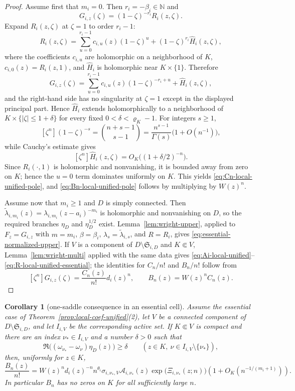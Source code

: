 \documentclass[reqno]{article}
\newtheorem{cor}[theorem]{Corollary}
\theoremstyle{definition}
\theoremstyle{remark}
\theoremstyle{plain}
\begin{document}
\begin{proof}
Assume first that $m_i=0$. Then $r_i=-\beta_i\in\mathbb N$ and
$$G_{i,z}(\zeta)=(1-\zeta)^{-r_i}R_i(z,\zeta).$$
Expand $R_i(z,\zeta)$ at $\zeta=1$ to order $r_i-1$:
$$R_i(z,\zeta)=\sum_{u=0}^{r_i-1}c_{i,u}(z)(1-\zeta)^u+(1-\zeta)^{r_i}\widehat H_i(z,\zeta),$$
where the coefficients $c_{i,u}$ are holomorphic on a neighborhood of $K$, $c_{i,0}(z)=R_i(z,1)$, and $\widehat H_i$ is holomorphic near $K\times\{1\}$. Therefore
$$G_{i,z}(\zeta)=\sum_{u=0}^{r_i-1}c_{i,u}(z)(1-\zeta)^{-r_i+u}+\widehat H_i(z,\zeta),$$
and the right-hand side has no singularity at $\zeta=1$ except in the displayed principal part. Hence $\widehat H_i$ extends holomorphically to a neighborhood of $K\times\{|\zeta|\le1+\delta\}$ for every fixed $0<\delta<\varrho_K-1$. For integers $s\ge1$,
$$[\zeta^n](1-\zeta)^{-s}=\binom{n+s-1}{s-1}
=\frac{n^{s-1}}{\Gamma(s)}\bigl(1+O(n^{-1})\bigr),$$
while Cauchy's estimate gives
$$[\zeta^n]\widehat H_i(z,\zeta)=O_K\!\bigl((1+\delta/2)^{-n}\bigr).$$
Since $R_i(\cdot,1)$ is holomorphic and nonvanishing, it is bounded away from zero on $K$; hence the $u=0$ term dominates uniformly on $K$. This yields \eqref{eq:Cn-local-unified-pole}, and \eqref{eq:Bn-local-unified-pole} follows by multiplying by $W(z)^n$.

Assume now that $m_i\ge1$ and $D$ is simply connected. Then $\widetilde\lambda_{i,m_i}(z)=\lambda_{i,m_i}(z-a_i)^{-m_i}$ is holomorphic and nonvanishing on $D$, so the required branches $\eta_D$ and $\eta_D^{1/2}$ exist. Lemma~\ref{lem:wright-upper}, applied to $F_z=G_{i,z}$ with $m=m_i$, $\beta=\beta_i$, $\lambda_s=\widetilde\lambda_{i,s}$, and $R=R_i$, gives \eqref{eq:essential-normalized-upper}. If $V$ is a component of $D\setminus\mathfrak S_{i,D}$ and $K\Subset V$, Lemma~\ref{lem:wright-multi} applied with the same data gives \eqref{eq:Ai-local-unified}--\eqref{eq:R-local-unified-essential}; the identities for $C_n/n!$ and $B_n/n!$ follow from
$$[\zeta^n]G_{i,z}(\zeta)=\frac{C_n(z)}{n!}d_i(z)^n,
\qquad B_n(z)=W(z)^nC_n(z).$$
\end{proof}

\begin{cor}[one-saddle consequence in an essential cell]\label{cor:essential-one-saddle}
Assume the essential case of Theorem~\ref{prop:local-coef-unified}\textup{(2)}, let $V$ be a connected component of $D\setminus\mathfrak S_{i,D}$, and let $I_{i,V}$ be the corresponding active set. If $K\Subset V$ is compact and there are an index $\nu_\ast\in I_{i,V}$ and a number $\delta>0$ such that
$$\Re\bigl((\omega_{\nu_\ast}-\omega_\nu)\eta_D(z)\bigr)\ge\delta
\qquad(z\in K,\ \nu\in I_{i,V}\setminus\{\nu_\ast\}),$$
then, uniformly for $z\in K$,
\begin{equation}\label{eq:Bn-essential-one-saddle}
\frac{B_n(z)}{n!}=W(z)^n d_i(z)^{-n}n^{\theta_i}\sigma_{i,\nu_\ast,V}\mathcal A_{i,\nu_\ast}(z)
\exp\!\bigl(\Xi_{i,\nu_\ast}(z;n)\bigr)
\left(1+O_K\!\left(n^{-1/(m_i+1)}\right)\right).
\end{equation}
In particular $B_n$ has no zeros on $K$ for all sufficiently large $n$.
\end{cor}
\end{document}
